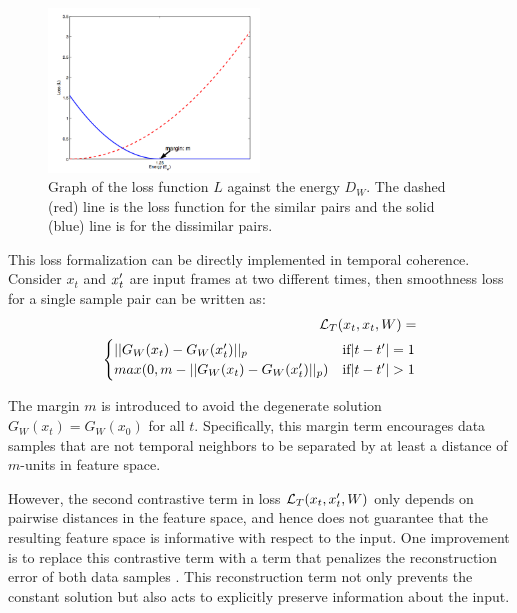 \begin{figure}
\centering
\includegraphics[width=0.5\textwidth]{images/twoloss.png}
\caption{Graph of the loss function $L$ against the energy $D_W$. The dashed (red) line is the loss function for the similar pairs and the solid (blue) line is for the dissimilar pairs.}
\label{fig:twoloss}
\end{figure}

This loss formalization can be directly implemented in temporal coherence. Consider $x_t$ and $x_t\rq{}$ are input frames at two different times, then smoothness loss for a single sample pair can be written as:
\begin{equation}
\begin{split}
\lagr_T(x_t, x_t, W) = \\
     \begin{cases}
        ||G_W(x_t) - G_W(x_t\rq{})||_p & \text{if} |t-t\rq{}| = 1\\
        max(0, m - ||G_W(x_t) - G_W(x_t\rq{})||_p) &\text{if} |t-t\rq{}| > 1 \\
    \end{cases}
\end{split}
\end{equation}

The margin $m$ is introduced to avoid the degenerate solution $G_W(x_t) = G_W(x_0)$ for all $t$. 
Specifically, this margin term encourages data samples that are not temporal neighbors to be separated by at least a distance of $m$-units in feature space. 

However, the second contrastive term in loss $\lagr_T(x_t, x_t\rq{}, W)$ only depends on pairwise distances in the feature space, and hence does not guarantee that the resulting feature space is informative with respect to the input. 
One improvement is to replace this contrastive term with a term that penalizes the reconstruction error of both data samples \cite{LeCun2014coherence}. 
This reconstruction term not only prevents the constant solution but also acts to explicitly preserve information about the input.

